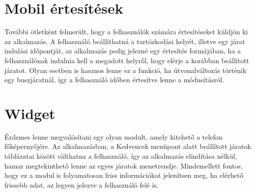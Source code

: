\section*{Mobil értesítések}
\label{pushnot}
További ötletként felmerült, hogy a felhasználók számára értesítéseket küldjön ki az alkalmazás.
A felhasználó beállíthatná a tartózkodási helyét, illetve egy járat indulási időpontját, az alkalmazás pedig jelezné egy értesítés formájában, ha a felhasználónak indulnia kell a megadott helyről, hogy elérje a korábban beállított járatot.
Olyan esetben is hasznos lenne ez a funkció, ha útvonalváltozás történik egy buszjáratnál, így a felhasználó időben értesítve lenne a módusításról.

\section*{Widget}
\label{widget}
Érdemes lenne megvalósítani egy olyan modult, amely kitehető a telefon főképernyőjére.
Az alkalmazásban, a Kedvencek menüpont alatt beállított járatok táblázatai között válthatna a felhasználó, így az alkalmazás elindítása nélkül, hamar megtekinthető lenne az egyes járatok menetrendje.
Mindemellett fontos, hogy ez a modul is folyamatosan friss információkat jelenítsen meg, ha elérhető frissebb adat, az legyen jelezve a felhasználó felé is.
\newpage